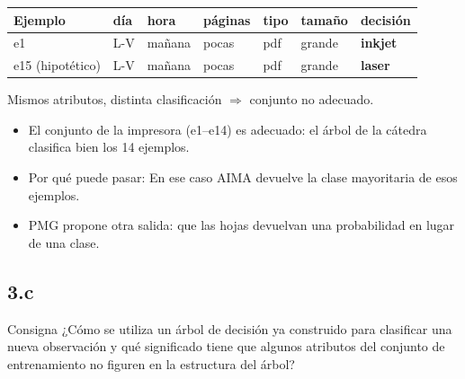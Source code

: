 \documentclass[11pt,a4paper]{article}
\begin{document}
\begin{center}
\small
\begin{tabular}{@{}l l l l l l l@{}}
\toprule
\textbf{Ejemplo} & \textbf{día} & \textbf{hora} & \textbf{páginas} & \textbf{tipo} & \textbf{tamaño} & \textbf{decisión} \\
\midrule
e1 & L-V & mañana & pocas & pdf & grande & \textbf{inkjet} \\
e15 (hipotético) & L-V & mañana & pocas & pdf & grande & \textbf{\color{ambar}laser} \\
\bottomrule
\end{tabular}

\smallskip
{\footnotesize Mismos atributos, distinta clasificación $\Rightarrow$ conjunto no adecuado.}
\end{center}

\begin{extras}
\begin{itemize}
  \item El conjunto de la impresora (e1--e14) es adecuado: el árbol de la cátedra clasifica bien los 14 ejemplos.
  \item Por qué puede pasar:  En ese caso AIMA devuelve la clase mayoritaria de esos ejemplos.
  \item PMG propone otra salida: que las hojas devuelvan una probabilidad en lugar de una clase.
\end{itemize}
\end{extras}

\subsection{3.c}

\begin{enunciado}{Consigna}
¿Cómo se utiliza un árbol de decisión ya construido para clasificar una nueva observación y qué significado tiene que algunos atributos del conjunto de entrenamiento no figuren en la estructura del árbol?
\end{enunciado}
\end{document}
